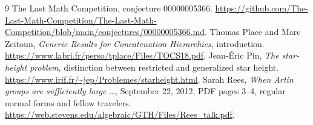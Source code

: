 \documentclass[11pt]{article}
\begin{document}
\begin{thebibliography}{9}
 The Last Math Competition, conjecture 00000005366.
\url{https://github.com/The-Last-Math-Competition/The-Last-Math-Competition/blob/main/conjectures/00000005366.md}.
 Thomas Place and Marc Zeitoun, \emph{Generic Results for Concatenation Hierarchies}, introduction.
\url{https://www.labri.fr/perso/tplace/Files/TOCS18.pdf}.
 Jean-\'Eric Pin, \emph{The star-height problem}, distinction between restricted and generalized star height.
\url{https://www.irif.fr/~jep/Problemes/starheight.html}.
 Sarah Rees, \emph{When Artin groups are sufficiently large \ldots}, September 22, 2012, PDF pages 3--4, regular normal forms and fellow travelers.
\url{https://web.stevens.edu/algebraic/GTH/Files/Rees_talk.pdf}.
\end{thebibliography}
\end{document}
